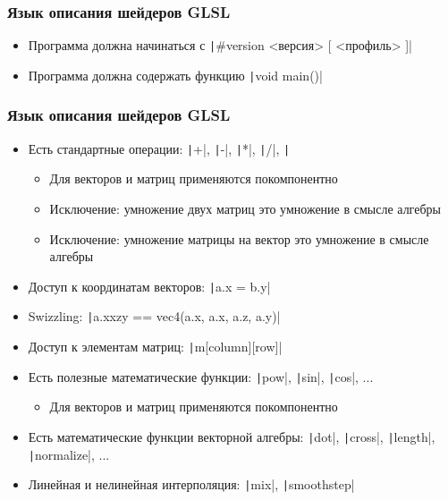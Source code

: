 \documentclass[10pt]{beamer}
\begin{document}
\begin{frame}[fragile]
\frametitle{Язык описания шейдеров GLSL}
\begin{itemize}
\item Программа должна начинаться с \texttt|#version <версия> [ <профиль> ]|
\pause
\item Программа должна содержать функцию \texttt|void main()|
\end{itemize}
\end{frame}

\begin{frame}[fragile]
\frametitle{Язык описания шейдеров GLSL}
\begin{itemize}
\item Есть стандартные операции: \texttt|+|, \texttt|-|, \texttt|*|, \texttt|/|, \texttt|%
\pause
\begin{itemize}
\item Для векторов и матриц применяются покомпонентно
\pause
\item Исключение: умножение двух матриц это умножение в смысле алгебры
\pause
\item Исключение: умножение матрицы на вектор это умножение в смысле алгебры
\end{itemize}
\pause
\item Доступ к координатам векторов: \texttt|a.x = b.y|
\pause
\item Swizzling: \texttt|a.xxzy == vec4(a.x, a.x, a.z, a.y)|
\pause
\item Доступ к элементам матриц: \texttt|m[column][row]|
\pause
\item Есть полезные математические функции: \texttt|pow|, \texttt|sin|, \texttt|cos|, ...
\pause
\begin{itemize}
\item Для векторов и матриц применяются покомпонентно
\end{itemize}
\pause
\item Есть математические функции векторной алгебры: \texttt|dot|, \texttt|cross|, \texttt|length|, \texttt|normalize|, ...
\pause
\item Линейная и нелинейная интерполяция: \texttt|mix|, \texttt|smoothstep|
\end{itemize}
\end{frame}
\end{document}
